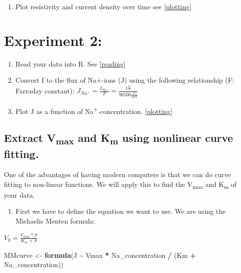 \documentclass[
]{book}
\newenvironment{Shaded}{\begin{snugshade}}{\end{snugshade}}
\newcommand{\FunctionTok}[1]{\textcolor[rgb]{0.13,0.29,0.53}{\textbf{#1}}}
\newcommand{\NormalTok}[1]{#1}
\newcommand{\OtherTok}[1]{\textcolor[rgb]{0.56,0.35,0.01}{#1}}
\newcommand{\SpecialCharTok}[1]{\textcolor[rgb]{0.81,0.36,0.00}{\textbf{#1}}}
\providecommand{\tightlist}{%
  \setlength{\itemsep}{0pt}\setlength{\parskip}{0pt}}
\begin{document}
\begin{enumerate}
\def\labelenumi{\arabic{enumi}.}
\setcounter{enumi}{3}
\tightlist
\item
  Plot resistivity and current density over time see \ref{plotting}
\end{enumerate}

\section{Experiment 2:}\label{experiment-2}

\begin{enumerate}
\def\labelenumi{\arabic{enumi}.}
\item
  Read your data into R. See \ref{reading}
\item
  Convert I to the flux of Na+-ions (J) using the following relationship (F: Farraday constant):
  \(J_{Na^+} = \frac {I_{Na^+}}{F} = \frac {1\frac {C} {s}} {96500 \frac {C} {mol}}\)
\item
  Plot J as a function of Na\textsuperscript{+}-concentration. \ref{plotting}
\end{enumerate}

\subsection{\texorpdfstring{Extract V\textsubscript{max} and K\textsubscript{m} using nonlinear curve fitting.}{Extract Vmax and Km using nonlinear curve fitting.}}\label{extract-vmax-and-km-using-nonlinear-curve-fitting.}

One of the advantages of having modern computers is that we can do curve fitting to non-linear functions. We will apply this to find the V\textsubscript{max} and K\textsubscript{m} of your data.

\begin{enumerate}
\def\labelenumi{\arabic{enumi}.}
\tightlist
\item
  First we have to define the equation we want to use. We are using the Michaelis Menten formula:
\end{enumerate}

\(V_0 = \frac {V_{max} * S}{K_m + S}\)

\begin{Shaded}
\begin{Highlighting}[]
\NormalTok{MMcurve }\OtherTok{\textless{}{-}} \FunctionTok{formula}\NormalTok{(J }\SpecialCharTok{\textasciitilde{}}\NormalTok{ Vmax }\SpecialCharTok{*}\NormalTok{ Na\_concentration }\SpecialCharTok{/}\NormalTok{ (Km }\SpecialCharTok{+}\NormalTok{ Na\_concentration))}
\end{Highlighting}
\end{Shaded}
\end{document}
